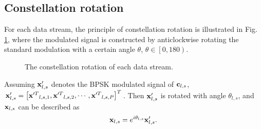 \documentclass[conference]{IEEEtran}
\begin{document}
\subsection{Constellation rotation}
For each data stream, the principle of constellation rotation is illustrated in Fig. \ref{fig.3}, where the modulated signal is constructed by anticlockwise rotating the standard modulation with a certain angle $\theta $, ${\theta} \in \left[ {0,180} \right)$.
\begin{figure}[h!]
\setlength{\abovecaptionskip}{0.cm}
\setlength{\belowcaptionskip}{-0.cm}
  \caption{The constellation rotation of each data stream.}
    \vspace{-1em}\label{fig.3}
\end{figure}

Assuming ${\bf{x}}{'_{l,s}}$ denotes the BPSK modulated signal of ${{\bf{c}}_{l,s}}$, ${\bf{x}}{'_{l,s}} = {\left[ {{\bf{x}}{'^T}_{l,s,1},{\bf{x}}{'^T}_{l,s,2}, \cdots ,{\bf{x}}{'^T}_{l,s,P}} \right]^T}$. Then ${\bf{x}}{'_{l,s}}$ is rotated with angle ${{\theta} _{l,s}}$, and ${{\bf{x}}_{l,s}}$ can be described as
\begin{equation}
{{\bf{x}}_{l,s}} = {e^{i{{\theta} _{l,s}}}}{\bf{x}}{'_{l,s}}\label{4}.
\end {equation}
\end{document}
